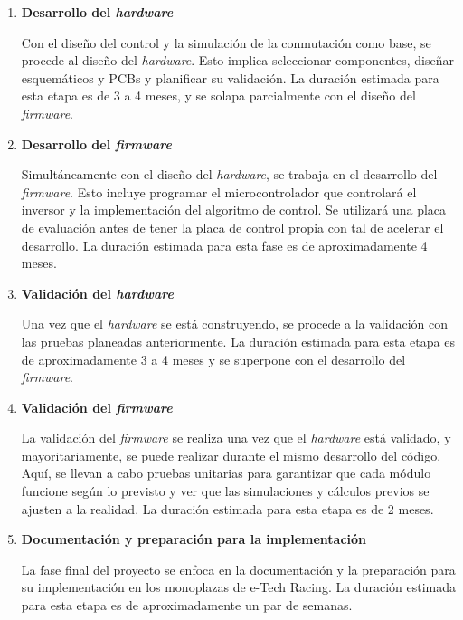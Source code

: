 \begin{enumerate}
\item \textbf{Desarrollo del \textit{hardware}}

Con el diseño del control y la simulación de la conmutación como base, se procede al diseño del \textit{hardware}. Esto implica seleccionar componentes, diseñar esquemáticos y PCBs y planificar su validación. La duración estimada para esta etapa es de 3 a 4 meses, y se solapa parcialmente con el diseño del \textit{firmware}.

\item \textbf{Desarrollo del \textit{firmware}}

Simultáneamente con el diseño del \textit{hardware}, se trabaja en el desarrollo del \textit{firmware}. Esto incluye programar el microcontrolador que controlará el inversor y la implementación del algoritmo de control. Se utilizará una placa de evaluación antes de tener la placa de control propia con tal de acelerar el desarrollo. La duración estimada para esta fase es de aproximadamente 4 meses.

\item \textbf{Validación del \textit{hardware}}

Una vez que el \textit{hardware} se está construyendo, se procede a la validación con las pruebas planeadas anteriormente. La duración estimada para esta etapa es de aproximadamente 3 a 4 meses y se superpone con el desarrollo del \textit{firmware}.

\item \textbf{Validación del \textit{firmware}}

La validación del \textit{firmware} se realiza una vez que el \textit{hardware} está validado, y mayoritariamente, se puede realizar durante el mismo desarrollo del código. Aquí, se llevan a cabo pruebas unitarias para garantizar que cada módulo funcione según lo previsto y ver que las simulaciones y cálculos previos se ajusten a la realidad. La duración estimada para esta etapa es de 2 meses.

\item \textbf{Documentación y preparación para la implementación}

La fase final del proyecto se enfoca en la documentación y la preparación para su implementación en los monoplazas de e-Tech Racing. La duración estimada para esta etapa es de aproximadamente un par de semanas. 

\end{enumerate}

\newpage

